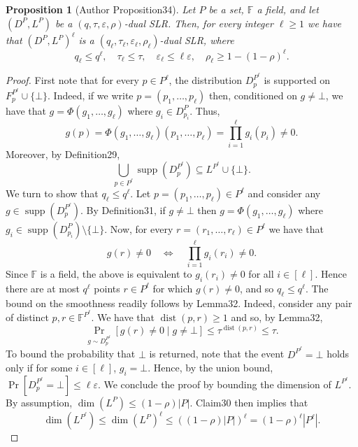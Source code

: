 \documentclass[10pt,a4paper]{article}
\newtheorem{ntproposition}[nttheorem]{Proposition}
\begin{document}
\begin{ntproposition}[Author Proposition34]
Let $P$ be a set, $\mathbb F$ a field, and let $(D^P,L^P)$ be a $(q,\tau,\varepsilon,\rho)$-dual SLR. Then, for every integer $\ell\geq1$ we have that $(D^P,L^P)^\ell$ is a $(q_\ell,\tau_\ell,\varepsilon_\ell,\rho_\ell)$-dual SLR, where
\[q_\ell\leq q^\ell,\quad\tau_\ell\leq\tau,\quad\varepsilon_\ell\leq\ell\varepsilon,\quad\rho_\ell\geq1-(1-\rho)^\ell.\]
\end{ntproposition}
\begin{proof}
First note that for every $p\in P^\ell$, the distribution $D_p^{P^\ell}$ is supported on $F_p^{P^\ell}\cup\{\bot\}$. Indeed, if we write $p=(p_1,\ldots,p_\ell)$ then, conditioned on $g\ne\bot$, we have that $g=\Phi(g_1,\ldots,g_\ell)$ where $g_i\in D_{p_i}^P$. Thus,
\[g(p)=\Phi(g_1,\ldots,g_\ell)(p_1,\ldots,p_\ell)=\prod_{i=1}^\ell g_i(p_i)\ne0.\]
Moreover, by Definition29,
\[\bigcup_{p\in P^\ell}\operatorname{supp}(D_p^{P^\ell})\subseteq L^{P^\ell}\cup\{\bot\}.\]
We turn to show that $q_\ell\leq q^\ell$. Let $p=(p_1,\ldots,p_\ell)\in P^\ell$ and consider any $g\in\operatorname{supp}(D_p^{P^\ell})$. By Definition31, if $g\ne\bot$ then $g=\Phi(g_1,\ldots,g_\ell)$ where $g_i\in\operatorname{supp}(D_{p_i}^P)\setminus\{\bot\}$. Now, for every $r=(r_1,\ldots,r_\ell)\in P^\ell$ we have that
\[g(r)\ne0\quad\Longleftrightarrow\quad\prod_{i=1}^\ell g_i(r_i)\ne0.\]
Since $\mathbb F$ is a field, the above is equivalent to $g_i(r_i)\ne0$ for all $i\in[\ell]$. Hence there are at most $q^\ell$ points $r\in P^\ell$ for which $g(r)\ne0$, and so $q_\ell\leq q^\ell$.
The bound on the smoothness readily follows by Lemma32. Indeed, consider any pair of distinct $p,r\in\mathbb F^{P^\ell}$. We have that $\operatorname{dist}(p,r)\geq1$ and so, by Lemma32,
\begin{equation}\Pr_{g\sim D_p^{P^\ell}}[g(r)\ne0\mid g\ne\bot]\leq\tau^{\operatorname{dist}(p,r)}\leq\tau.\tag{4.2}\end{equation}
To bound the probability that $\bot$ is returned, note that the event $D^{P^\ell}=\bot$ holds only if for some $i\in[\ell]$, $g_i=\bot$. Hence, by the union bound, $\Pr[D_p^{P^\ell}=\bot]\leq\ell\varepsilon$. We conclude the proof by bounding the dimension of $L^{P^\ell}$. By assumption, $\dim(L^P)\leq(1-\rho)|P|$. Claim30 then implies that
\[\dim(L^{P^\ell})\leq\dim(L^P)^\ell\leq((1-\rho)|P|)^\ell=(1-\rho)^\ell|P^\ell|.\]
\end{proof}
\end{document}
